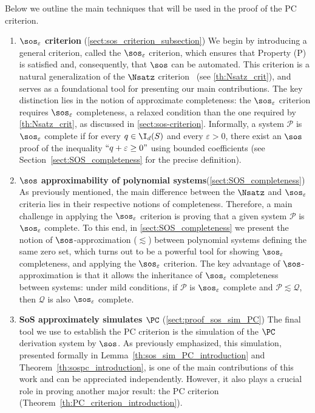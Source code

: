 \documentclass[11pt]{article}
\begin{document}
Below we outline the main techniques that will be used in the proof of the PC criterion. 

\begin{enumerate}
    \item \textbf{$\sos_\varepsilon$ criterion} (\cref{sect:sos_criterion_subsection}) We begin by introducing a general criterion, called the $\sos_\varepsilon$ criterion, which ensures that Property (\textsc P) is satisfied and, consequently, that $\sos$ can be automated. This criterion is a natural generalization of the $\Nsatz$ criterion~\cite{raghavendra_weitz2017} (see \cref{th:Nsatz_crit}), and serves as a foundational tool for presenting our main contributions. The key distinction lies in the notion of approximate completeness: the $\sos_\varepsilon$ criterion requires $\sos_\varepsilon$ completeness, a relaxed condition than the one required by \cref{th:Nsatz_crit}, as discussed in \cref{sect:sos-criterion}.
Informally, a system $\mathcal{P}$ is $\sos_\varepsilon$ complete if for every $q \in \I_d(S)$ and every $\varepsilon > 0$, there exist an $\sos$ proof of the inequality $``q + \varepsilon \geq 0"$ using bounded coefficients (see Section~\ref{sect:SOS_completeness} for the precise definition).
    \item \textbf{$\sos$ approximability of polynomial systems}(\cref{sect:SOS_completeness}) As previously mentioned, the main difference between the $\Nsatz$ and $\sos_\varepsilon$ criteria lies in their respective notions of completeness. Therefore, a main challenge in applying the $\sos_\varepsilon$ criterion is proving that a given system $\mathcal{P}$ is $\sos_\varepsilon$ complete. To this end, in \cref{sect:SOS_completeness} we present the notion of $\sos$-approximation ($\lesssim$) between polynomial systems defining the same zero set, which turns out to be a powerful tool for showing $\sos_\varepsilon$ completeness, and applying the $\sos_\varepsilon$ criterion.
The key advantage of $\sos$-approximation is that it allows the inheritance of $\sos_\varepsilon$ completeness between systems: under mild conditions, if $\mathcal{P}$ is $\sos_\varepsilon$ complete and $\mathcal{P} \lesssim \mathcal{Q}$, then $\mathcal{Q}$ is also $\sos_\varepsilon$ complete.
    \item {\textbf{SoS approximately simulates $\PC$}} (\cref{sect:proof_sos_sim_PC}) The final tool we use to establish the PC criterion is the simulation of the $\PC$ derivation system by $\sos$. As previously emphasized, this simulation, presented formally in Lemma~\ref{th:sos_sim_PC_introduction} and Theorem~\ref{th:sospc_introduction}, is one of the main contributions of this work and can be appreciated independently. However, it also plays a crucial role in proving another major result: the PC criterion (Theorem~\ref{th:PC_criterion_introduction}).

\end{enumerate}
\end{document}
